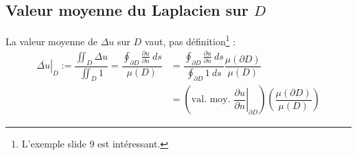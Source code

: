 \documentclass[british,french,11pt, a4paper, openany]{book}
\begin{document}
																		
																		
				\subsection{Valeur moyenne du Laplacien sur $D$}
				La valeur moyenne de $\Delta u$ sur $D$ vaut, pas définition\footnote{L'exemple slide 9 est
				intéressant.} :
				\begin{equation}
					\begin{array}{ll}
						\left.\overline{\Delta u}\right|_D := \dfrac{\iint_D \Delta u}{\iint_D 1} = \dfrac{\oint_{
						\partial D} \frac{\partial u}{\partial n}\ ds}{\mu(D)} & = \dfrac{\oint_{\partial D}                                                                     
						\frac{\partial u}{\partial n}\ ds}{\oint_{\partial D} 1\ ds}\dfrac{\mu(\partial D)}{\mu(
						D)}\\
						                                                       & = \left(\text{val. moy. } \left.\dfrac{\partial u}{\partial n}\right|_{\partial D}\right)\left( 
						\dfrac{\mu(\partial D)}{\mu(
						D)}\right)
					\end{array}
				\end{equation}
																		
				
					
					
				\appendix
					
					
\end{document}
